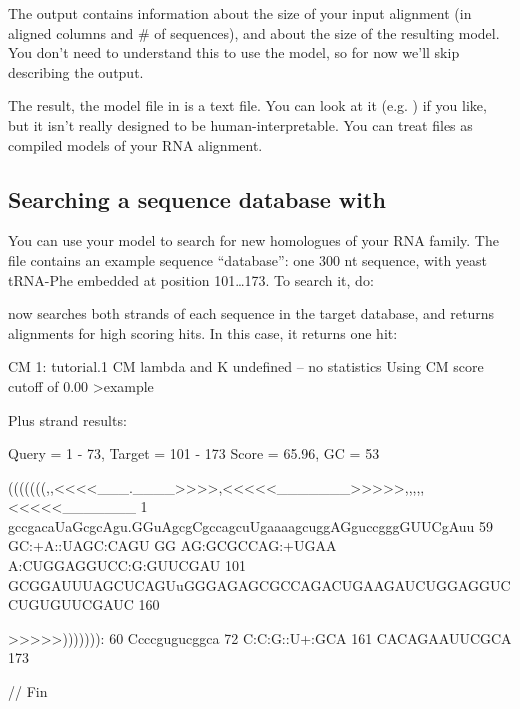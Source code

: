 The output  contains information about the size of your
input alignment (in aligned columns and \# of sequences), and about
the size of the resulting model. You don't need to understand this to
use the model, so for now we'll skip describing the output. 

The result, the model file in  is a text file. You can
look at it (e.g. ) if you like, but it isn't really
designed to be human-interpretable. You can treat  files as
compiled models of your RNA alignment.

\newpage
\subsection{Searching a sequence database with }

You can use your model to search for new homologues of your RNA
family. The file  contains an example sequence
``database'': one 300 nt sequence, with yeast tRNA-Phe embedded at
position 101\ldots173. To search it, do:


 now searches both strands of each sequence in the
target database, and returns alignments for high scoring hits.  In
this case, it returns one hit:

\begin{sreoutput}
CM 1: tutorial.1
CM lambda and K undefined -- no statistics
Using CM score cutoff of 0.00
>example

  Plus strand results:

 Query = 1 - 73, Target = 101 - 173
 Score = 65.96, GC =  53

           (((((((,,<<<<___.____>>>>,<<<<<_______>>>>>,,,,,<<<<<_______
         1 gccgacaUaGcgcAgu.GGuAgcgCgccagcuUgaaaagcuggAGguccgggGUUCgAuu 59      
           GC:+A::UAGC:CAGU GG AG:GCGCCAG:+UGAA A:CUGGAGGUCC:G:GUUCGAU 
       101 GCGGAUUUAGCUCAGUuGGGAGAGCGCCAGACUGAAGAUCUGGAGGUCCUGUGUUCGAUC 160     

           >>>>>))))))):
        60 Ccccgugucggca 72      
           C:C:G::U+:GCA
       161 CACAGAAUUCGCA 173     


//
Fin
\end{sreoutput}

